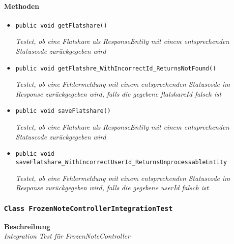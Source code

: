  \paragraph*{Methoden}
 \begin{itemize}
 	\item{\texttt{public void getFlatshare()}}
 	
 	\textit{Testet, ob eine Flatshare als ResponseEntity mit einem entsprechenden Statuscode zurückgegeben wird}
 	
 	\item{\texttt{public void getFlatshre\_WithIncorrectId\_ReturnsNotFound()}}
 	
 	\textit{Testet, ob eine Fehlermeldung mit einem entsprechenden Statuscode im Response zurückgegeben wird, falls die gegebene flatshareId falsch ist}
 	
 	\item{\texttt{public void saveFlatshare()}}
 	
 	\textit{Testet, ob eine Flatshare als ResponseEntity mit einem entsprechenden Statuscode zurückgegeben wird}
 	
 	\item{\texttt{public void saveFlatshare\_WithIncorrectUserId\_Returns\-UnprocessableEntity}}
 	
 	\textit{Testet, ob eine Fehlermeldung mit einem entsprechenden Statuscode im Response zurückgegeben wird, falls die gegebene userId falsch ist}
 \end{itemize}
 
 \subsubsection{\texttt{Class FrozenNoteControllerIntegrationTest}}
 \textbf{Beschreibung} \\
 \textit{Integration Test für FrozenNoteController}
